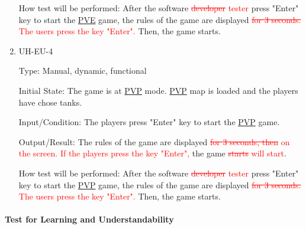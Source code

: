 \documentclass[12pt, titlepage]{article}
\begin{document}
\begin{enumerate}
How test will be performed: After the software  \textcolor{red}{\sout{developer} tester} press "Enter" key to start the \underline{PVE} game, the rules of the game are displayed \textcolor{red}{\sout{for 3 seconds.} The users press the key "Enter".} Then, the game starts.

\item{UH-EU-4\\}

Type: Manual, dynamic, functional
					
Initial State: The game is at \underline{PVP} mode. \underline{PVP} map is loaded and the players have chose tanks.
					
Input/Condition: The players press "Enter" key to start the \underline{PVP} game. 
					
Output/Result: The rules of the game are displayed \textcolor{red}{\sout{for 3 seconds, then} on the screen. If the players press the key "Enter",} the game \textcolor{red}{\sout{starts} will start}.
					
How test will be performed: After the software  \textcolor{red}{\sout{developer} tester} press "Enter" key to start the \underline{PVP} game, the rules of the game are displayed \textcolor{red}{\sout{for 3 seconds.} The users press the key "Enter".} Then, the game starts.
\end{enumerate}

\paragraph{Test for Learning and Understandability}
\end{document}

